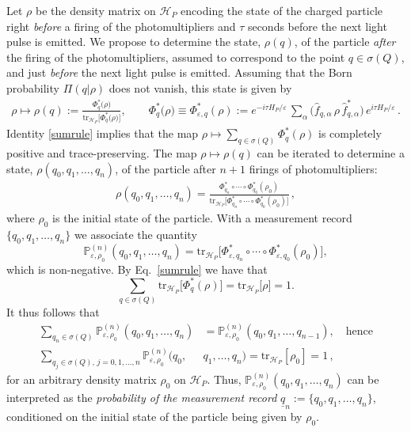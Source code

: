 \documentclass[12pt]{article}
\begin{document}
Let $\rho$ be the density matrix on $\mathcal{H}_{P}$ encoding the state of the charged particle 
right \textit{before} a firing of the photomultipliers and $\tau$ seconds before the next light pulse is emitted. 
We propose to determine the state, $\rho(q)$, of the particle \textit{after} the firing of the photomultipliers, assumed to
correspond to the point $q\in \sigma(Q)$, and just \textit{before} the next light pulse is emitted. Assuming that the Born
probability $\Pi(q \vert \rho)$ does not vanish, this state is given by
\begin{align}\label{state}
\rho \mapsto \rho(q):= \frac{\Phi_{q}^{*}\big(\rho\big)}{\text{tr}_{\mathcal{H}_P}
\big[\Phi_{q}^{*}\big(\rho\big)\big] }, \qquad
 \Phi_{q}^{*}\big(\rho\big)\equiv \Phi_{\varepsilon, q}^{*}(\rho) := 
e^{-i\tau H_P/\varepsilon}\,\sum_{\alpha}\Big(\widehat{f}_{q, \alpha}\, \rho\, \widehat{f}_{q, \alpha}^{*}\Big)\, 
e^{i\tau H_P/\varepsilon}\,.
\end{align}
Identity \eqref{sumrule} implies that the map $\rho \mapsto \sum_{q\in \sigma(Q)} \Phi^{*}_{q}(\rho)$ is completely 
positive and trace-preserving. The map $\rho \mapsto \rho(q)$ can be iterated to determine a state, 
$\rho(q_0, q_1, \dots , q_n)$, of the particle after $n+1$ firings of photomultipliers:
\begin{align}\label{track record}
\rho(q_0, q_1, \dots, q_n)= \frac{\Phi_{q_n}^{*} \circ \cdots \circ \Phi_{q_0}^{*}(\rho_0)}{\text{tr}_{\mathcal{H}_P}\big[\Phi_{q_n}^{*} \circ \cdots \circ \Phi_{q_0}^{*}(\rho_0)\big]}\,,
\end{align}
where $\rho_0 $ is the initial state of the particle.
With a measurement record $\big\{q_0, q_1, \dots, q_n\big\}$ we associate the quantity
\begin{equation}\label{proba}
\mathbb{P}_{\varepsilon, \rho_0}^{(n)}(q_0, q_1, \dots, q_n) =\text{tr}_{\mathcal{H}_P}\big[\Phi_{\varepsilon, q_n}^{*} \circ \cdots \circ \Phi_{\varepsilon, q_0}^{*}(\rho_0)\big],
\end{equation}
which is non-negative. By Eq.~\eqref{sumrule} we have that 
$$\sum_{q\in \sigma(Q)} \text{tr}_{\mathcal{H}_P}\big[\Phi_{q}^{*}(\rho)\big] = \text{tr}_{\mathcal{H}_P}\big[\rho\big] =1.$$
It thus follows that
\begin{align}\label{Kolmogorov}
\sum_{q_n\in \sigma(Q)} \mathbb{P}_{\varepsilon, \rho_0}^{(n)}(q_0,q_1, \dots, q_n) &= \mathbb{P}_{\varepsilon, \rho_0}^{(n)}(q_0,q_1, \dots, q_{n-1}), \quad \text{hence}\nonumber\\
\sum_{q_j\in \sigma(Q),\, j=0,1,\dots, n} \mathbb{P}_{\varepsilon, \rho_0}^{(n)}(q_0,&q_1, \dots, q_n) =
\text{tr}_{\mathcal{H}_P}[\rho_0]=1\,,
\end{align}
for an arbitrary density matrix $\rho_0$ on $\mathcal{H}_P$. Thus, 
$\mathbb{P}_{\varepsilon, \rho_0}^{(n)}(q_0,q_1, \dots, q_n)$ can be interpreted as the \textit{probability of the 
measurement record} $\underline{q}_n := \big\{q_0, q_1, \dots, q_n \big\}$, conditioned on the initial state of the particle being
given by $\rho_0$. 
\end{document}
